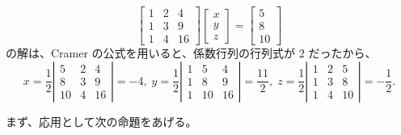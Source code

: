 \begin{eg}
$$\left[\begin{array}{ccc}1 & 2 & 4\\ 1 & 3 & 9\\ 1 & 4 & 16 \end{array}\right]
\left[\begin{array}{c}x \\y \\ z\end{array}\right] = 
\left[\begin{array}{c}5 \\8 \\ 10\end{array}\right]$$
の解は、Cramer の公式を用いると、係数行列の行列式が 2 だったから、
$$x = \frac12\left|\begin{array}{ccc}5 & 2 & 4\\ 8 & 3 & 9\\ 10 & 4 & 16\end{array}\right| = -4,\;y = \frac12\left|\begin{array}{ccc}1 & 5 & 4\\ 1 &8 & 9\\ 1 & 10 & 16\end{array}\right| = \frac{11}2,\;z = \frac12\left|\begin{array}{ccc}1 & 2 & 5\\ 1 & 3 & 8\\ 1 & 4 & 10\end{array}\right| = -\frac{1}{2}.$$
\end{eg}


\newpage
{}
まず、応用として次の命題をあげる。

